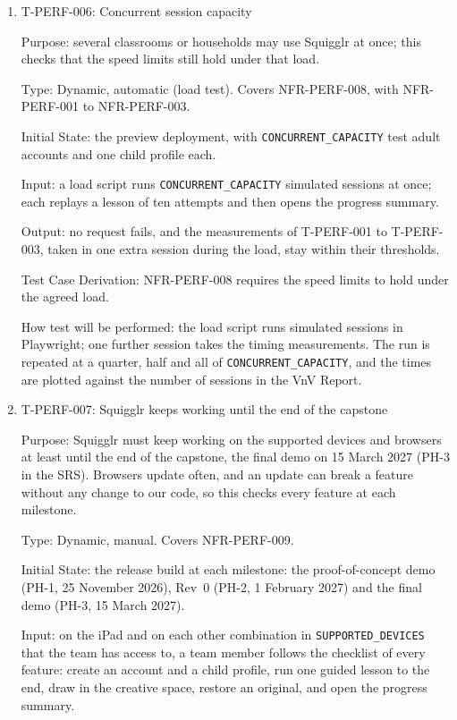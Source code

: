 \documentclass[12pt, titlepage]{article}
\newcommand{\testitem}[1]{\item #1\par\nopagebreak}
\begin{document}
\begin{enumerate}
How test will be performed: after each run, the script reads the child's
attempt records through the test database and compares them with the
attempts made. This test is shared with SAF-RAY-003 and SAF-SHA-003
(safety-critical tests below).

\testitem{T-PERF-006: Concurrent session capacity}

Purpose: several classrooms or households may use Squigglr at once; this checks that the speed limits still hold under that load.

Type: Dynamic, automatic (load test). Covers NFR-PERF-008, with NFR-PERF-001 to
NFR-PERF-003.

Initial State: the preview deployment, with \texttt{CONCURRENT\_CAPACITY}
test adult accounts and one child profile each.

Input: a load script runs \texttt{CONCURRENT\_CAPACITY} simulated sessions
at once; each replays a lesson of ten attempts and then opens the progress
summary.

Output: no request fails, and the measurements of T-PERF-001 to T-PERF-003,
taken in one extra session during the load, stay within their thresholds.

Test Case Derivation: NFR-PERF-008 requires the speed limits to hold under
the agreed load.

How test will be performed: the load script runs simulated sessions in
Playwright; one further session takes the timing measurements. The run
is repeated at a quarter, half and all of \texttt{CONCURRENT\_CAPACITY},
and the times are plotted against the number of sessions in the VnV Report.

\testitem{T-PERF-007: Squigglr keeps working until the end of the capstone}

Purpose: Squigglr must keep working on the supported devices and browsers at
least until the end of the capstone, the final demo on 15 March 2027 (PH-3 in
the SRS). Browsers update often, and an update can break a feature without
any change to our code, so this checks every feature at each milestone.

Type: Dynamic, manual. Covers NFR-PERF-009.

Initial State: the release build at each milestone: the proof-of-concept
demo (PH-1, 25 November 2026), Rev~0 (PH-2, 1 February 2027) and the final
demo (PH-3, 15 March 2027).

Input: on the iPad and on each other combination in
\texttt{SUPPORTED\_\allowbreak DEVICES} that the team has access to, a team member
follows the checklist of every feature: create an account and a child
profile, run one guided lesson to the end, draw in the creative space,
restore an original, and open the progress summary.


\end{enumerate}
\end{document}
